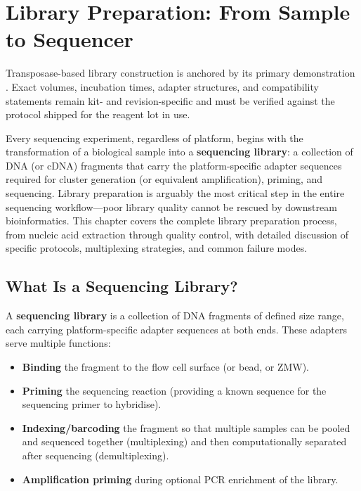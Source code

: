 \chapter{Library Preparation: From Sample to Sequencer}
\label{ch:libprep}

\begin{sourcebox}
Transposase-based library construction is anchored by its primary demonstration \cite{adey2010}. Exact volumes, incubation times, adapter structures, and compatibility statements remain kit- and revision-specific and must be verified against the protocol shipped for the reagent lot in use.
\end{sourcebox}

Every sequencing experiment, regardless of platform, begins with the transformation of a biological sample into a \textbf{sequencing library}: a collection of DNA (or cDNA) fragments that carry the platform-specific adapter sequences required for cluster generation (or equivalent amplification), priming, and sequencing. Library preparation is arguably the most critical step in the entire sequencing workflow---poor library quality cannot be rescued by downstream bioinformatics. This chapter covers the complete library preparation process, from nucleic acid extraction through quality control, with detailed discussion of specific protocols, multiplexing strategies, and common failure modes.

\section{What Is a Sequencing Library?}
\label{sec:what_is_library}

\begin{keyconcept}[title={Definition of a Sequencing Library}]
A \textbf{sequencing library} is a collection of DNA fragments of defined size range, each carrying platform-specific adapter sequences at both ends. These adapters serve multiple functions:
\begin{itemize}[nosep]
  \item \textbf{Binding} the fragment to the flow cell surface (or bead, or ZMW).
  \item \textbf{Priming} the sequencing reaction (providing a known sequence for the sequencing primer to hybridise).
  \item \textbf{Indexing/barcoding} the fragment so that multiple samples can be pooled and sequenced together (multiplexing) and then computationally separated after sequencing (demultiplexing).
  \item \textbf{Amplification priming} during optional PCR enrichment of the library.
\end{itemize}
\end{keyconcept}

